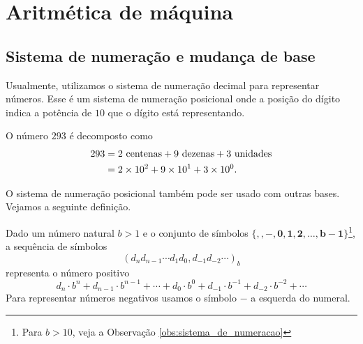 
%

\chapter{Aritmética de máquina}

\section{Sistema de numeração e mudança de base}
Usualmente, utilizamos o sistema de numeração decimal para representar números. Esse é um sistema de numeração posicional onde a posição do dígito indica a potência de $10$ que o dígito está representando.

\begin{ex}
  O número $293$ é decomposto como
  \begin{equation*}
    \begin{split}
      293 &= 2\ \hbox{centenas}+9\ \hbox{dezenas}+3\ \hbox{unidades}\\
      &= 2\times 10^2+9\times 10^1+3\times 10^0.      
    \end{split}
  \end{equation*}
\end{ex}

O sistema de numeração posicional também pode ser usado com outras bases. Vejamos a seguinte definição.

\begin{defn}\label{def:sistema_de_numeracao}
Dado um número natural $b>1$ e o conjunto de símbolos $\{\pmb{,}, \pmb{-},  \pmb{0}, \pmb{1}, \pmb{2},\dotsc, \pmb{b-1}\}$\footnote{Para $b>10$, veja a Observação \ref{obs:sistema_de_numeracao}}, a sequência de símbolos
\begin{equation*}
  \left(d_nd_{n-1} \cdots d_1d_0,d_{-1}d_{-2} \cdots \right)_b  
\end{equation*}
representa o número positivo
\begin{equation*}
  d_n\cdot b^n + d_{n-1}\cdot b^{n-1} + \cdots + d_0\cdot b^0 + d_{-1}\cdot b^{-1}+d_{-2}\cdot b^{-2} + \cdots
\end{equation*}
Para representar números negativos usamos o símbolo $-$ a esquerda do numeral.
\end{defn}

